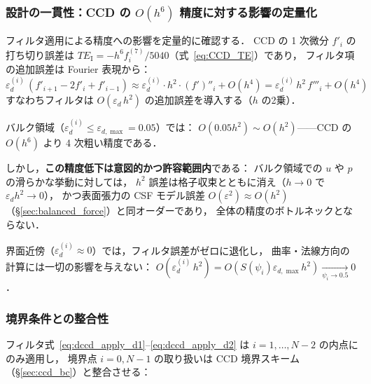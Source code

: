 \subsubsection{設計の一貫性：CCD の $O(h^6)$ 精度に対する影響の定量化}
\label{sec:dccd_accuracy_impact}

フィルタ適用による精度への影響を定量的に確認する．
CCD の 1 次微分 $f'_i$ の打ち切り誤差は $TE_\mathrm{I} = -h^6 f^{(7)}_i/5040$（式~\eqref{eq:CCD_TE}）であり，
フィルタ項の追加誤差は Fourier 表現から：
\begin{equation}
  \varepsilon_d^{(i)}\,(f'_{i+1} - 2f'_i + f'_{i-1})
  \approx \varepsilon_d^{(i)} \cdot h^2 \cdot (f')''_i + O(h^4)
  = \varepsilon_d^{(i)}\,h^2\,f'''_i + O(h^4)
  \label{eq:dccd_accuracy_error}
\end{equation}
すなわちフィルタは $O(\varepsilon_d\,h^2)$ の追加誤差を導入する（$h$ の2乗）．

バルク領域（$\varepsilon_d^{(i)} \leq \varepsilon_{d,\max} = 0.05$）では：
$O(0.05h^2) \sim O(h^2)$——CCD の $O(h^6)$ より 4 次粗い精度である．

しかし，\textbf{この精度低下は意図的かつ許容範囲内}である：
バルク領域での $u$ や $p$ の滑らかな挙動に対しては，
$h^2$ 誤差は格子収束とともに消え（$h \to 0$ で $\varepsilon_d h^2 \to 0$），
かつ表面張力の CSF モデル誤差 $O(\varepsilon^2) \approx O(h^2)$（§\ref{sec:balanced_force}）と同オーダーであり，
全体の精度のボトルネックとならない．

界面近傍（$\varepsilon_d^{(i)} \approx 0$）では，フィルタ誤差がゼロに退化し，
曲率・法線方向の計算には一切の影響を与えない：
$O(\varepsilon_d^{(i)}\,h^2) = O(S(\psi_i)\varepsilon_{d,\max}h^2) \xrightarrow[\psi_i \to 0.5]{} 0$．

\subsubsection{境界条件との整合性}
\label{sec:dccd_bc}

フィルタ式~\eqref{eq:dccd_apply_d1}--\eqref{eq:dccd_apply_d2} は $i = 1, \ldots, N-2$ の内点にのみ適用し，
境界点 $i = 0, N-1$ の取り扱いは CCD 境界スキーム（§\ref{sec:ccd_bc}）と整合させる：

